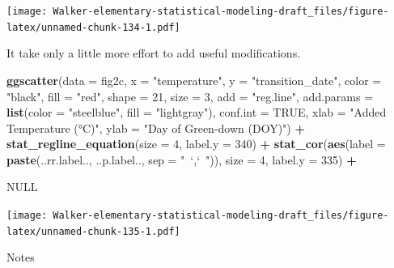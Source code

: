 \documentclass[]{book}
\newenvironment{Shaded}{\begin{snugshade}}{\end{snugshade}}
\newcommand{\DataTypeTok}[1]{\textcolor[rgb]{0.13,0.29,0.53}{#1}}
\newcommand{\DecValTok}[1]{\textcolor[rgb]{0.00,0.00,0.81}{#1}}
\newcommand{\KeywordTok}[1]{\textcolor[rgb]{0.13,0.29,0.53}{\textbf{#1}}}
\newcommand{\NormalTok}[1]{#1}
\newcommand{\OperatorTok}[1]{\textcolor[rgb]{0.81,0.36,0.00}{\textbf{#1}}}
\newcommand{\OtherTok}[1]{\textcolor[rgb]{0.56,0.35,0.01}{#1}}
\newcommand{\StringTok}[1]{\textcolor[rgb]{0.31,0.60,0.02}{#1}}
\begin{document}
\texttt{[image: Walker-elementary-statistical-modeling-draft\_files/figure-latex/unnamed-chunk-134-1.pdf]}

It take only a little more effort to add useful modifications.

\begin{Shaded}
\begin{Highlighting}[]
\KeywordTok{ggscatter}\NormalTok{(}\DataTypeTok{data =}\NormalTok{ fig2c,}
          \DataTypeTok{x =} \StringTok{"temperature"}\NormalTok{,}
          \DataTypeTok{y =} \StringTok{"transition_date"}\NormalTok{,}
          \DataTypeTok{color =} \StringTok{"black"}\NormalTok{,}
          \DataTypeTok{fill =} \StringTok{"red"}\NormalTok{,}
          \DataTypeTok{shape =} \DecValTok{21}\NormalTok{,}
          \DataTypeTok{size =} \DecValTok{3}\NormalTok{,}
          \DataTypeTok{add =} \StringTok{"reg.line"}\NormalTok{,}
          \DataTypeTok{add.params =} \KeywordTok{list}\NormalTok{(}\DataTypeTok{color =} \StringTok{"steelblue"}\NormalTok{,}
                            \DataTypeTok{fill =} \StringTok{"lightgray"}\NormalTok{),}
          \DataTypeTok{conf.int =} \OtherTok{TRUE}\NormalTok{,}
          \DataTypeTok{xlab =} \StringTok{"Added Temperature (°C)"}\NormalTok{,}
          \DataTypeTok{ylab =} \StringTok{"Day of Green-down (DOY)"}\NormalTok{) }\OperatorTok{+}
\StringTok{  }
\StringTok{  }\KeywordTok{stat_regline_equation}\NormalTok{(}\DataTypeTok{size =} \DecValTok{4}\NormalTok{,}
                        \DataTypeTok{label.y =} \DecValTok{340}\NormalTok{) }\OperatorTok{+}
\StringTok{  }\KeywordTok{stat_cor}\NormalTok{(}\KeywordTok{aes}\NormalTok{(}\DataTypeTok{label =} \KeywordTok{paste}\NormalTok{(..rr.label.., ..p.label.., }\DataTypeTok{sep =} \StringTok{"~`,`~"}\NormalTok{)),}
           \DataTypeTok{size =} \DecValTok{4}\NormalTok{,}
           \DataTypeTok{label.y =} \DecValTok{335}\NormalTok{) }\OperatorTok{+}

\StringTok{  }\OtherTok{NULL}
\end{Highlighting}
\end{Shaded}

\texttt{[image: Walker-elementary-statistical-modeling-draft\_files/figure-latex/unnamed-chunk-135-1.pdf]}

Notes
\end{document}
